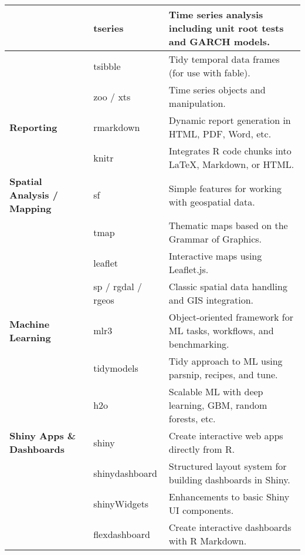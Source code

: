 \begin{longtable}{|p{4cm}|p{3cm}|p{7cm}|}
\hline
 & tseries & Time series analysis including unit root tests and GARCH models. \\
\hline
 & tsibble & Tidy temporal data frames (for use with fable). \\
\hline
 & zoo / xts & Time series objects and manipulation. \\
\hline
\textbf{Reporting} & rmarkdown & Dynamic report generation in HTML, PDF, Word, etc. \\
\hline
 & knitr & Integrates R code chunks into LaTeX, Markdown, or HTML. \\
\hline
\textbf{Spatial Analysis / Mapping} & sf & Simple features for working with geospatial data. \\
\hline
 & tmap & Thematic maps based on the Grammar of Graphics. \\
\hline
 & leaflet & Interactive maps using Leaflet.js. \\
\hline
 & sp / rgdal / rgeos & Classic spatial data handling and GIS integration. \\
\hline
\textbf{Machine Learning} & mlr3 & Object-oriented framework for ML tasks, workflows, and benchmarking. \\
\hline
 & tidymodels & Tidy approach to ML using parsnip, recipes, and tune. \\
\hline
 & h2o & Scalable ML with deep learning, GBM, random forests, etc. \\
\hline
\textbf{Shiny Apps \& Dashboards} & shiny & Create interactive web apps directly from R. \\
\hline
 & shinydashboard & Structured layout system for building dashboards in Shiny. \\
\hline
 & shinyWidgets & Enhancements to basic Shiny UI components. \\
\hline
 & flexdashboard & Create interactive dashboards with R Markdown. \\
\hline
\end{longtable}
\clearpage


